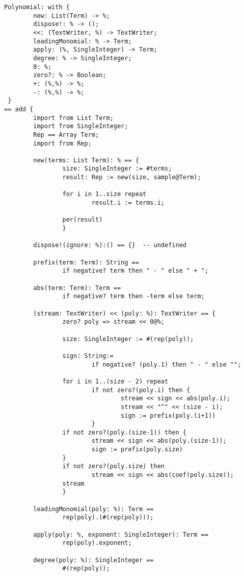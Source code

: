 \begin{small}
\begin{verbatim}
Polynomial: with {
        new: List(Term) -> %;
        dispose!: % -> ();
        <<: (TextWriter, %) -> TextWriter;
        leadingMonomial: % -> Term;
        apply: (%, SingleInteger) -> Term;
        degree: % -> SingleInteger;
        0: %;
        zero?: % -> Boolean;
        +: (%,%) -> %;
        -: (%,%) -> %;
 }
== add {
        import from List Term;
        import from SingleInteger;
        Rep == Array Term;
        import from Rep;

        new(terms: List Term): % == {
                size: SingleInteger := #terms;
                result: Rep := new(size, sample@Term);

                for i in 1..size repeat
                        result.i := terms.i;

                per(result)
                }

        dispose!(ignore: %):() == {}  -- undefined

        prefix(term: Term): String == 
                if negative? term then " - " else " + ";

        abs(term: Term): Term == 
                if negative? term then -term else term;

        (stream: TextWriter) << (poly: %): TextWriter == {
                zero? poly => stream << 0@%;

                size: SingleInteger := #(rep(poly));

                sign: String:=
                        if negative? (poly.1) then " - " else "";

                for i in 1..(size - 2) repeat
                        if not zero?(poly.i) then {
                                stream << sign << abs(poly.i);
                                stream << "^" << (size - i);
                                sign := prefix(poly.(i+1))
                        }
                if not zero?(poly.(size-1)) then {
                        stream << sign << abs(poly.(size-1));
                        sign := prefix(poly.size)
                }
                if not zero?(poly.size) then 
                        stream << sign << abs(coef(poly.size));
                stream
                }

        leadingMonomial(poly: %): Term == 
                rep(poly).(#(rep(poly)));

        apply(poly: %, exponent: SingleInteger): Term == 
                rep(poly).exponent;

        degree(poly: %): SingleInteger == 
                #(rep(poly));


\end{verbatim}
\end{small}
